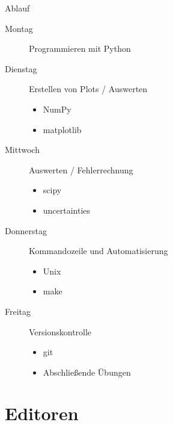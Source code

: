 \begin{frame}{Ablauf}
  \begin{description}
    \item[Montag] Programmieren mit Python
    \item[Dienstag] Erstellen von Plots / Auswerten
      \begin{itemize}
        \item NumPy
        \item matplotlib
      \end{itemize}
    \item[Mittwoch] Auswerten / Fehlerrechnung
      \begin{itemize}
        \item scipy
        \item uncertainties
      \end{itemize}
    \item[Donnerstag] Kommandozeile und Automatisierung
      \begin{itemize}
        \item Unix
        \item make
      \end{itemize}
    \item[Freitag] Versionskontrolle
      \begin{itemize}
        \item git
        \item Abschließende Übungen
      \end{itemize}
  \end{description}
\end{frame}

\section{Editoren}




